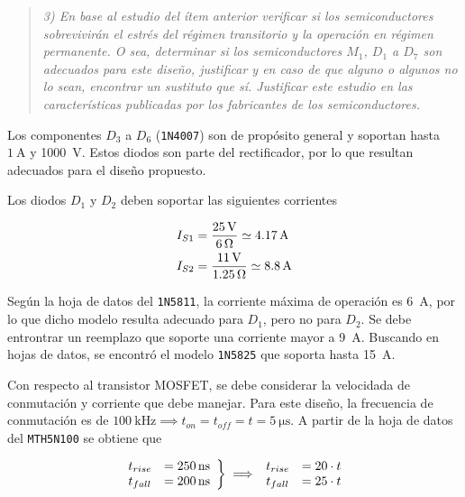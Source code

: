 \begin{quote} \textit{3) En base al estudio del ítem anterior verificar si los semiconductores sobrevivirán el estrés del régimen transitorio y la operación en régimen permanente. O sea, determinar si los semiconductores $M_1$, $D_1$ a $D_7$ son adecuados para este diseño, justificar y en caso de que alguno o algunos no lo sean, encontrar un sustituto que sí. Justificar este estudio en las características publicadas por los fabricantes de los semiconductores. }
\end{quote}

	Los componentes $D_3$ a $D_6$ (\texttt{1N4007}) son de propósito general y soportan hasta $\SI{1}{\ampere}$ y \SI{1000}{\volt}. Estos diodos son parte del rectificador, por lo que resultan adecuados para el diseño propuesto.


	Los diodos $D_1$ y $D_2$ deben soportar las siguientes corrientes

	\begin{align*}
		\centering
		I_{S1} &= \frac{\SI{25}{\volt}}{\SI{6}{\ohm}} \simeq \SI{4.17}{\ampere} \\
		I_{S2} &= \frac{\SI{11}{\volt}}{\SI{1.25}{\ohm}} \simeq \SI{8.8}{\ampere} 
	\end{align*}

	Según la hoja de datos del \texttt{1N5811}, la corriente máxima de operación es \SI{6}{\ampere}, por lo que dicho modelo resulta adecuado para $D_1$, pero no para $D_2$. Se debe entrontrar un reemplazo que soporte una corriente mayor a \SI{9}{\ampere}. 	Buscando en hojas de datos, se encontró el modelo \texttt{1N5825} que soporta hasta \SI{15}{\ampere}.


	Con respecto al transistor MOSFET, se debe considerar la velocidada de conmutación y corriente que debe manejar. Para este diseño, la frecuencia de conmutación es de $\SI{100}{\kilo\hertz} \implies t_{on} = t_{off} = t = \SI{5}{\micro\second}$. A partir de la hoja de datos del \texttt{MTH5N100} se obtiene que 

\begin{equation}
	\centering
	\left. \begin{array}{lc}
		t_{rise} &= \SI{250}{\nano\second} \\
		t_{fall} &= \SI{200}{\nano\second}
	\end{array}	\right\} \implies 
	\begin{array}{lc}
		t_{rise} &= 20 \cdot t \\
		t_{fall} &=  25 \cdot t
	\end{array}
\end{equation}

